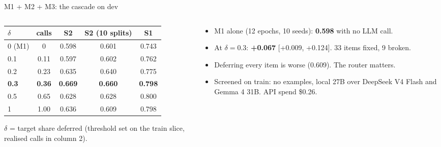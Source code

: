 \documentclass[aspectratio=169,10pt]{beamer}
\newcommand{\hl}[1]{\textcolor{accent}{\textbf{#1}}}
\begin{document}
\begin{frame}{M1 + M2 + M3: the cascade on dev}
  \begin{columns}[T]
    \begin{column}{0.56\textwidth}
      \small
      \begin{tabular}{@{}lcccc@{}}
        \toprule
        $\delta$ & calls & S2 & S2 (10 splits) & S1 \\
        \midrule
        0 (M1) & 0 & 0.598 & 0.601 & 0.743 \\
        0.1 & 0.11 & 0.597 & 0.602 & 0.762 \\
        0.2 & 0.23 & 0.635 & 0.640 & 0.775 \\
        \textbf{0.3} & \textbf{0.36} & \textbf{0.669} & \textbf{0.660} & \textbf{0.798} \\
        0.5 & 0.65 & 0.628 & 0.628 & 0.800 \\
        1 & 1.00 & 0.636 & 0.609 & 0.798 \\
        \bottomrule
      \end{tabular}
      \vspace{4pt}

      \footnotesize $\delta$ = target share deferred (threshold set on the train slice, realised calls in column 2).
    \end{column}
    \begin{column}{0.42\textwidth}
      \small
      \begin{itemize}
        \item M1 alone (12 epochs, 10 seeds): \hl{0.598} with no LLM call.
        \item At $\delta=0.3$: \hl{+0.067} [+0.009, +0.124]. 33 items fixed, 9 broken.
        \item Deferring every item is worse (0.609). The router matters.
        \item Screened on train: no examples, local 27B over DeepSeek V4 Flash and Gemma 4 31B. API spend \$0.26.
      \end{itemize}
    \end{column}
  \end{columns}
\end{frame}
\end{document}
